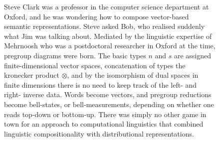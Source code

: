 \begin{figure}[h!]
\centering
{}
\caption{Steve Clark was a professor in the computer science department at Oxford, and he was wondering how to compose vector-based semantic representations. Steve asked Bob, who realised suddenly what Jim was talking about. Mediated by the linguistic expertise of Mehrnoosh who was a postdoctoral researcher in Oxford at the time, pregroup diagrams were born. The basic types $n$ and $s$ are assigned finite-dimensional vector spaces, concatenation of types the kronecker product $\otimes$, and by the isomorphism of dual spaces in finite dimensions there is no need to keep track of the left- and right- inverse data. Words become vectors, and pregroup reductions become bell-states, or bell-measurements, depending on whether one reads top-down or bottom-up. There was simply no other game in town for an approach to computational linguistics that combined linguistic compositionality with distributional representations.}
\end{figure}

